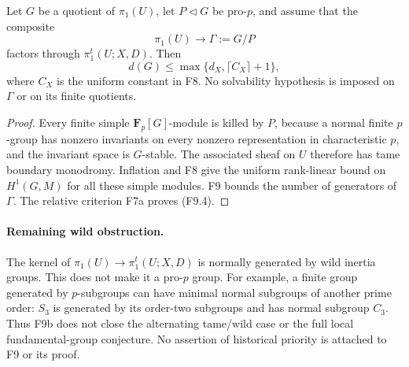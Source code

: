 \begin{corollary}
Let $G$ be a quotient of $\pi_1(U)$, let $P\triangleleft G$ be
pro-$p$, and assume that the composite
\[
 \pi_1(U)\longrightarrow\Gamma:=G/P
\]
factors through $\pi_1^t(U;X,D)$. Then
\[
 d(G)\leq\max\{d_X,\lceil C_X\rceil+1\},
 \tag{F9.4}
\]
where $C_X$ is the uniform constant in F8. No solvability
hypothesis is imposed on $\Gamma$ or on its finite quotients.
\end{corollary}
\begin{proof}
Every finite simple $\mathbf F_p[G]$-module is killed by $P$,
because a normal finite $p$-group has nonzero invariants on every
nonzero representation in characteristic $p$, and the invariant
space is $G$-stable. The associated sheaf on $U$ therefore has
tame boundary monodromy. Inflation and F8 give the uniform
rank-linear bound on $H^1(G,M)$ for all these simple modules.
F9 bounds the number of generators of $\Gamma$. The relative
criterion F7a proves (F9.4).
\end{proof}

\paragraph{Remaining wild obstruction.}
The kernel of $\pi_1(U)\to\pi_1^t(U;X,D)$ is normally generated
by wild inertia groups. This does not make it a pro-$p$ group.
For example, a finite group generated by $p$-subgroups can have
minimal normal subgroups of another prime order: $S_3$ is generated
by its order-two subgroups and has normal subgroup $C_3$.
Thus F9b does not close the alternating tame/wild case or the full
local fundamental-group conjecture. No assertion of historical
priority is attached to F9 or its proof.
